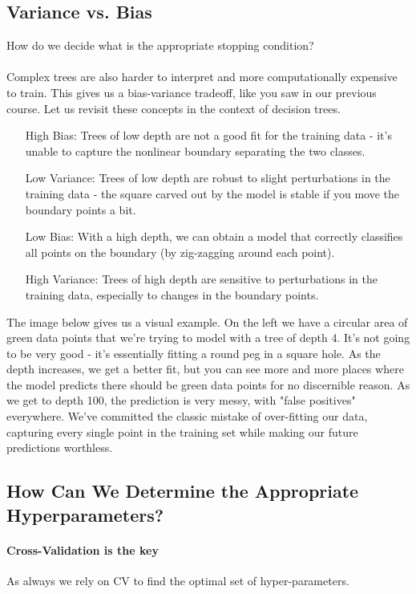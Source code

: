 \documentclass[11pt,a4paper]{report}
\begin{document}
\subsection{Variance vs. Bias}
How do we decide what is the appropriate stopping condition?\\\\
Complex trees are also harder to interpret and more computationally expensive to train. This gives us a bias-variance tradeoff, like you saw in our previous course. Let us revisit these concepts in the context of decision trees.
\begin{itemize}
\item[High Bias:]Trees of low depth are not a good fit for the training data - it’s unable to capture the nonlinear boundary separating the two classes.
\item[Low Variance:]Trees of low depth are robust to slight perturbations in the training data - the square carved out by the model is stable if you move the boundary points a bit.
\item[Low Bias:] With a high depth, we can obtain a model that correctly classifies all points on the boundary (by zig-zagging around each point).
\item[High Variance:]Trees of high depth are sensitive to perturbations in the training data, especially to changes in the boundary points.
\end{itemize}
The image below gives us a visual example. On the left we have a circular area of green data points that we're trying to model with a tree of depth 4. It's not going to be very good - it's essentially fitting a round peg in a square hole. As the depth increases, we get a better fit, but you can see more and more places where the model predicts there should be green data points for no discernible reason. As we get to depth 100, the prediction is very messy, with "false positives" everywhere. We've committed the classic mistake of over-fitting our data, capturing every single point in the training set while making our future predictions worthless.\\
\subsection*{How Can We Determine the Appropriate Hyperparameters?}
\paragraph{Cross-Validation is the key} As always we rely on CV to find the optimal set of hyper-parameters.
\end{document}
